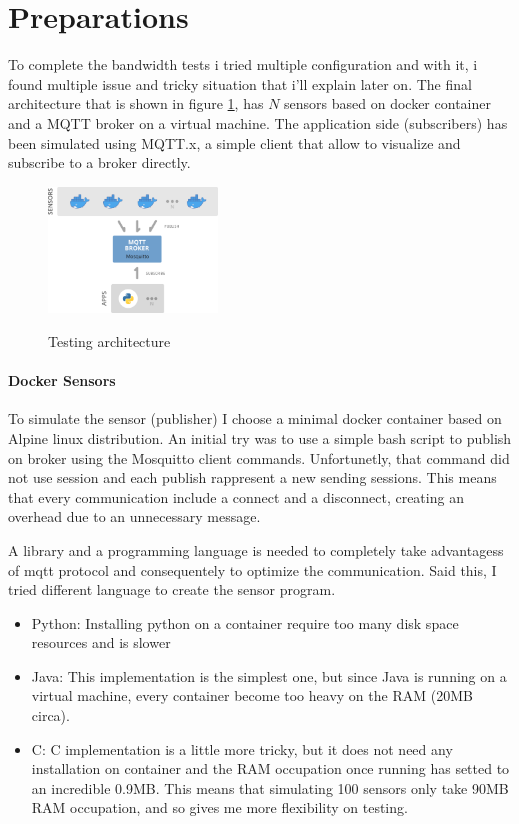 \documentclass[journal]{IEEEtran}
\begin{document}
\section{Preparations}
To complete the bandwidth tests i tried multiple configuration and with it, i found multiple issue and tricky situation that i'll explain later on. 
The final architecture that is shown in figure \ref{fig:strut}, has $N$ sensors based on docker container and a MQTT broker on a virtual machine. The application side (subscribers) has been simulated using MQTT.x, a simple client that allow to visualize and subscribe to a broker directly. 

\begin{figure}[h]
	\centering
	\includegraphics[width=0.4\textwidth]{struttura}
	\label{fig:strut}
	\caption{Testing architecture}
\end{figure}

\paragraph{Docker Sensors}
To simulate the sensor (publisher) I choose a minimal docker container based on Alpine linux distribution. 
An initial try was to use a simple bash script to publish on broker using the Mosquitto client commands. Unfortunetly, that command did not use session and each publish rappresent a new sending sessions. This means that every communication include a connect and a disconnect, creating an overhead due to an unnecessary message.

A library and a programming language is needed to completely take advantagess of mqtt protocol and consequentely to optimize the communication. 
Said this, I tried different language to create the sensor program. 

\begin{itemize}
	\item Python: Installing python on a container require too many disk space resources and is slower
	\item Java: This implementation is the simplest one, but since Java is running on a virtual machine, every container become too heavy on the RAM (20MB circa).
	\item C: C implementation is a little more tricky, but it does not need any installation on container and the RAM occupation once running has setted to an incredible 0.9MB. This means that simulating 100 sensors only take 90MB RAM occupation, and so gives me more flexibility on testing. 
\end{itemize}
\end{document}

